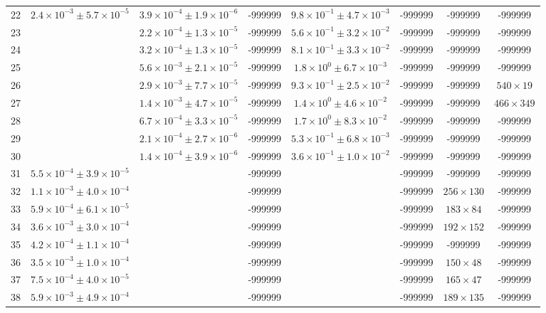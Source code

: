 \begin{table}
\begin{tabular}{cccccccc}
22 & $2.4\times10^{-3}\pm 5.7\times10^{-5}$ & $3.9\times10^{-4}\pm 1.9\times10^{-6}$ & -999999 & $9.8\times10^{-1}\pm 4.7\times10^{-3}$ & -999999 & -999999 & -999999 \\
23 &  & $2.2\times10^{-4}\pm 1.3\times10^{-5}$ & -999999 & $5.6\times10^{-1}\pm 3.2\times10^{-2}$ & -999999 & -999999 & -999999 \\
24 &  & $3.2\times10^{-4}\pm 1.3\times10^{-5}$ & -999999 & $8.1\times10^{-1}\pm 3.3\times10^{-2}$ & -999999 & -999999 & -999999 \\
25 &  & $5.6\times10^{-3}\pm 2.1\times10^{-5}$ & -999999 & $1.8\times10^{0}\pm 6.7\times10^{-3}$ & -999999 & -999999 & -999999 \\
26 &  & $2.9\times10^{-3}\pm 7.7\times10^{-5}$ & -999999 & $9.3\times10^{-1}\pm 2.5\times10^{-2}$ & -999999 & -999999 & $540\times 19$ \\
27 &  & $1.4\times10^{-3}\pm 4.7\times10^{-5}$ & -999999 & $1.4\times10^{0}\pm 4.6\times10^{-2}$ & -999999 & -999999 & $466\times 349$ \\
28 &  & $6.7\times10^{-4}\pm 3.3\times10^{-5}$ & -999999 & $1.7\times10^{0}\pm 8.3\times10^{-2}$ & -999999 & -999999 & -999999 \\
29 &  & $2.1\times10^{-4}\pm 2.7\times10^{-6}$ & -999999 & $5.3\times10^{-1}\pm 6.8\times10^{-3}$ & -999999 & -999999 & -999999 \\
30 &  & $1.4\times10^{-4}\pm 3.9\times10^{-6}$ & -999999 & $3.6\times10^{-1}\pm 1.0\times10^{-2}$ & -999999 & -999999 & -999999 \\
31 & $5.5\times10^{-4}\pm 3.9\times10^{-5}$ &  & -999999 &  & -999999 & -999999 & -999999 \\
32 & $1.1\times10^{-3}\pm 4.0\times10^{-4}$ &  & -999999 &  & -999999 & $256\times 130$ & -999999 \\
33 & $5.9\times10^{-4}\pm 6.1\times10^{-5}$ &  & -999999 &  & -999999 & $183\times 84$ & -999999 \\
34 & $3.6\times10^{-3}\pm 3.0\times10^{-4}$ &  & -999999 &  & -999999 & $192\times 152$ & -999999 \\
35 & $4.2\times10^{-4}\pm 1.1\times10^{-4}$ &  & -999999 &  & -999999 & -999999 & -999999 \\
36 & $3.5\times10^{-3}\pm 1.0\times10^{-4}$ &  & -999999 &  & -999999 & $150\times 48$ & -999999 \\
37 & $7.5\times10^{-4}\pm 4.0\times10^{-5}$ &  & -999999 &  & -999999 & $165\times 47$ & -999999 \\
38 & $5.9\times10^{-3}\pm 4.9\times10^{-4}$ &  & -999999 &  & -999999 & $189\times 135$ & -999999 \\

\end{tabular}
\end{table}

